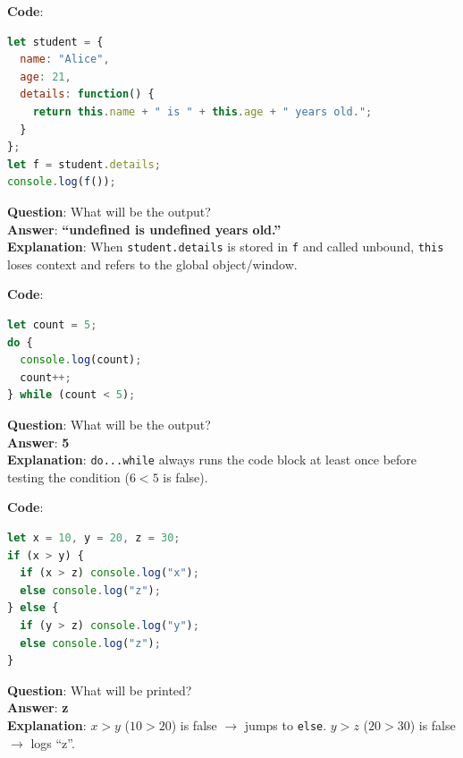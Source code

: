 \begin{quizbox}
\textbf{Code}:
\begin{lstlisting}[language=JavaScript]
let student = {
  name: "Alice",
  age: 21,
  details: function() {
    return this.name + " is " + this.age + " years old.";
  }
};
let f = student.details;
console.log(f());
\end{lstlisting}
\textbf{Question}: What will be the output?\\
\textbf{Answer}: \textbf{``undefined is undefined years old.''}\\
\textbf{Explanation}: When \texttt{student.details} is stored in \texttt{f} and called unbound, \texttt{this} loses context and refers to the global object/window.
\end{quizbox}

\begin{quizbox}
\textbf{Code}:
\begin{lstlisting}[language=JavaScript]
let count = 5;
do {
  console.log(count);
  count++;
} while (count < 5);
\end{lstlisting}
\textbf{Question}: What will be the output?\\
\textbf{Answer}: \textbf{5}\\
\textbf{Explanation}: \texttt{do...while} always runs the code block at least once before testing the condition ($6 < 5$ is false).
\end{quizbox}

\begin{quizbox}
\textbf{Code}:
\begin{lstlisting}[language=JavaScript]
let x = 10, y = 20, z = 30;
if (x > y) {
  if (x > z) console.log("x");
  else console.log("z");
} else {
  if (y > z) console.log("y");
  else console.log("z");
}
\end{lstlisting}
\textbf{Question}: What will be printed?\\
\textbf{Answer}: \textbf{z}\\
\textbf{Explanation}: $x > y$ ($10 > 20$) is false $\to$ jumps to \texttt{else}. $y > z$ ($20 > 30$) is false $\to$ logs ``z''.
\end{quizbox}
